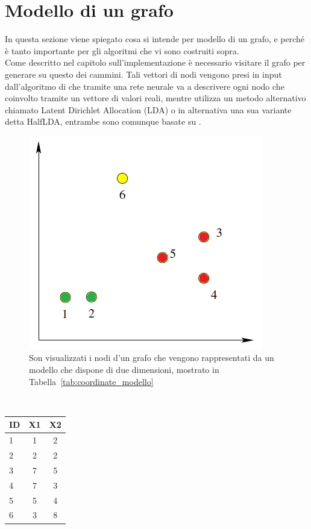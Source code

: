 \section{Modello di un grafo}
In questa sezione viene spiegato cosa si intende per modello di un grafo, e perché è tanto importante per gli algoritmi che vi sono costruiti sopra.\\
Come descritto nel capitolo sull'implementazione è necessario visitare il grafo per generare su questo dei cammini. Tali vettori di nodi vengono presi in input dall'algoritmo di \wv che tramite una rete neurale va a descrivere ogni nodo che coinvolto tramite un vettore di valori reali, mentre \cnrl utilizza un metodo alternativo chiamato Latent Dirichlet Allocation (LDA)\cite{LDA} o in alternativa una sua variante detta HalfLDA, entrambe sono comunque basate su \wv.\\
\begin{figure}[htp]
	\centering
	\includegraphics{immagini/punti_modello}
	\caption{Son visualizzati i nodi d'un grafo che vengono rappresentati da un modello che dispone di due dimensioni, mostrato in Tabella~\ref{tab:coordinate_modello}}
	\label{fig:grafico_modello}
\end{figure}
\\
\begin{center}
	\begin{tabular}{|l|cc|}
		\hline
		ID&X1&X2\\
		\hline
		1 & 1 & 2\\
		2 & 2 & 2\\
		3 & 7 & 5\\
		4 & 7 & 3\\
		5 & 5 & 4\\
		6 & 3 & 8\\
		\hline
	\end{tabular}
	\label{tab:coordinate_modello}
\end{center}
